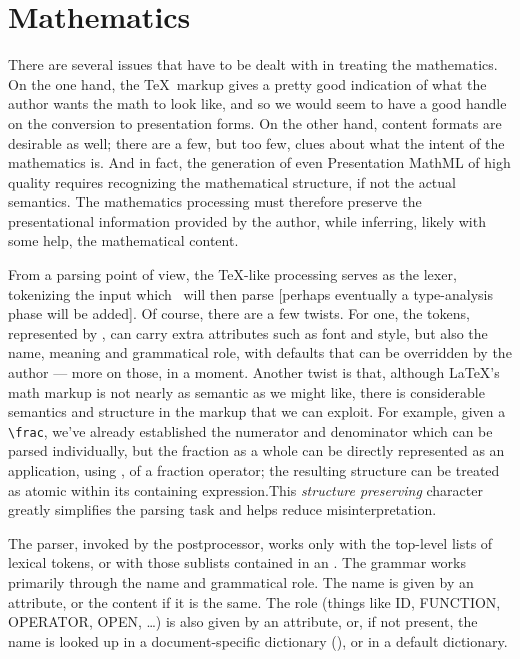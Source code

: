 \documentclass{book}
\newcommand{\ltxcode}{\lstinline[style=inlinelatexml]}
\begin{document}
\chapter{Mathematics}\label{math}


There are several issues that have to be dealt with in treating the mathematics.
On the one hand, the \TeX\ markup gives a pretty good indication of what the
author wants the math to look like, and so we would seem to have a good handle
on the conversion to presentation forms.  On the other hand, content formats
are desirable as well; there are a few, but too few, clues about what the
intent of the mathematics is.  And in fact, the generation of even Presentation
MathML of high quality requires recognizing the mathematical structure, if not
the actual semantics. The mathematics processing must therefore preserve the
presentational information provided by the author, while inferring, likely
with some help, the mathematical content.

From a parsing point of view, the \TeX-like processing serves as the lexer,
tokenizing the input which \LaTeXML\ will then parse
[perhaps eventually a type-analysis phase will be added].
Of course, there are a few twists.
For one, the tokens, represented by , can carry extra attributes
such as font and style, but also the name, meaning and grammatical role,
with defaults that can be overridden by the author --- more on those, in a moment.
Another twist is that, although \LaTeX's math markup is not nearly
as semantic as we might like, there is considerable semantics and structure in the 
markup that we can exploit. For example, given a \verb|\frac|, we've already
established the numerator and denominator which can be parsed individually,
but the fraction as a whole can be directly represented as an application,
using , of a fraction operator; the resulting structure can be treated
as atomic within its containing expression.This \emph{structure preserving} character
greatly simplifies the parsing task and helps reduce misinterpretation.

The parser, invoked by the postprocessor, works only with the top-level lists of lexical tokens,
or with those sublists contained in an .  The grammar works primarily through
the name and grammatical role.  The name is given by an attribute, or the content if it is
the same.  The role (things like ID, FUNCTION, OPERATOR, OPEN, \ldots) is also given
by an attribute, or, if not present, the name is looked up in a document-specific
dictionary (), or in a default dictionary.
\end{document}
